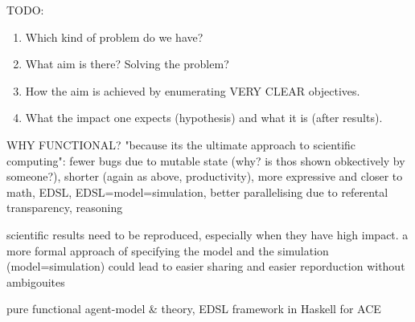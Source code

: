 \documentclass{article}
\begin{document}
TODO:
\begin{enumerate}
\item Which kind of problem do we have?
\item What aim is there? Solving the problem? 
\item How the aim is achieved by enumerating VERY CLEAR objectives.
\item What the impact one expects (hypothesis) and what it is (after results).
\end{enumerate}

WHY FUNCTIONAL? "because its the ultimate approach to scientific computing": fewer bugs due to mutable state (why? is thos shown obkectively by someone?), shorter (again as above, productivity), more expressive and closer to math, EDSL, EDSL=model=simulation, better parallelising due to referental transparency, reasoning

scientific results need to be reproduced, especially when they have high impact. a more formal approach of specifying the model and the simulation (model=simulation) could lead to easier sharing and easier reporduction without ambigouites

pure functional agent-model \& theory, EDSL framework in Haskell for ACE
\end{document}
